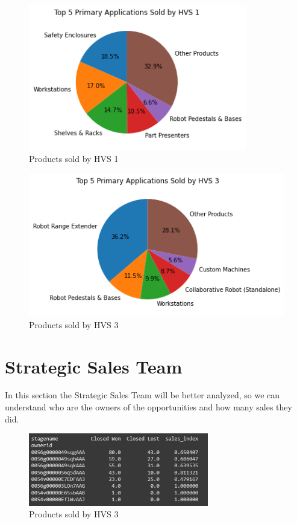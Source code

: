 \documentclass[]{report}
\begin{document}
\begin{figure}[htb]
	\centering
	\includegraphics[width=0.85\textwidth]{fig_03_hvs_1}
	\caption{Products sold by HVS 1}
	\label{fig:fig_03b}
\end{figure}

\begin{figure}[!t]
	\centering
	\includegraphics[width=1\textwidth]{fig_03_hvs_3}
	\caption{Products sold by HVS 3}
	\label{fig:fig_03c}
\end{figure}


\clearpage
\section{Strategic Sales Team}

In this section the Strategic Sales Team will be better analyzed, so we can understand who are the owners of the opportunities and how many sales they did. 

\begin{figure}[htb]
	\centering
	\includegraphics[width=0.70\textwidth]{fig_04_sellers}
	\caption{Products sold by HVS 3}
	\label{fig:fig_04}
\end{figure}
\end{document}
